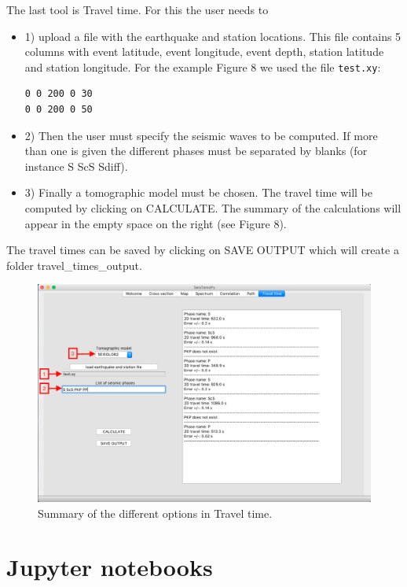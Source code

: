 \documentclass[12pt]{article}
\begin{document}
The last tool is Travel time. For this the user needs to
\begin{itemize}
\item 1) upload a file
with the earthquake and station locations. This file contains 5 columns
with event latitude, event longitude, event depth, station latitude and
station longitude.  For the example Figure 8 we used the file \verb|test.xy|:

\begin{verbatim}
0 0 200 0 30
0 0 200 0 50
\end{verbatim}

\item 2) Then the user must specify  the seismic waves to be
computed. If more than one is given the different phases must be separated by blanks (for instance S ScS Sdiff).
\item 3) Finally  a tomographic model must be chosen. The travel
time will be computed by clicking on CALCULATE. The summary of the
calculations will appear in the empty space on the right (see Figure 8).
\end{itemize}

The travel times can be saved by clicking on SAVE OUTPUT which will
create a folder travel\_times\_output.

\begin{figure}
\begin{center}
\includegraphics[scale=0.35]{SeisTomoPy_notebook/figures/timepy.png}
\caption{Summary of the different options in Travel time.}
\label{timrpy}
\end{center}
\end{figure}

\newpage

\section{Jupyter notebooks}\label{notebooks}
\end{document}

